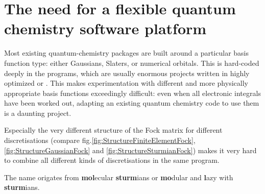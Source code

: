 
\section{The need for a flexible quantum chemistry software platform}



%
%


Most existing quantum-chemistry packages
are built around a 
particular basis function type: either Gaussians,
Slaters, or numerical orbitals. This is hard-coded 
deeply in the programs, which are usually enormous
projects written in  highly optimized \cpp or \fortran.
This makes experimentation with different and more physically
appropriate basis functions exceedingly difficult:
even when all electronic integrals have been worked out,
adapting an existing quantum chemistry code to use
them is a daunting project.

Especially the very different structure of the Fock matrix for
different discretisations (compare fig.\vref{fig:StructureFiniteElementFock},
\vref{fig:StructureGaussianFock} and \vref{fig:StructureSturmianFock})
makes it very hard to combine all different kinds of discretisations
in the same program.

The name \molsturm origates from \textbf{mol}ecular \textbf{sturm}ians
or \textbf{mo}dular and \textbf{l}azy with \textbf{sturm}ians.




